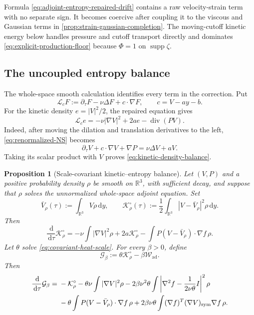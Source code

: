 \documentclass[11pt]{amsart}
\numberwithin{equation}{section}
\theoremstyle{plain}
\newtheorem{proposition}[proposition]{Proposition}
\theoremstyle{definition}
\theoremstyle{remark}
\newcommand{\R}{\mathbb R}
\newcommand{\dd}{\,\mathrm d}
\newcommand{\diver}{\operatorname{div}}
\newcommand{\supp}{\operatorname{supp}}
\begin{document}
Formula \eqref{eq:adjoint-entropy-repaired-drift} contains a raw
velocity-strain term with no separate sign.  It becomes
coercive after coupling it to the viscous and Gaussian terms in
\cref{prop:strain-gaussian-completion}.  The moving-cutoff kinetic energy below
handles pressure and cutoff transport directly and dominates
\eqref{eq:explicit-production-floor} because \(\Phi=1\) on
\(\supp\zeta\).

\subsection{The uncoupled entropy balance}

The whole-space smooth calculation identifies every term in the correction.
Put
\begin{equation}\label{eq:repaired-material-operator}
 \mathcal L_cF:=\partial_\tau F-\nu\Delta F+c\cdot\nabla F,
 \qquad c=V-ay-b.
\end{equation}
For the kinetic density \(e=|V|^2/2\), the repaired equation gives
\begin{equation}\label{eq:kinetic-density-balance}
 \mathcal L_ce
 =-\nu|\nabla V|^2+2ae-\diver(PV).
\end{equation}
Indeed, after moving the dilation and translation derivatives to the left,
\eqref{eq:renormalized-NS} becomes
\[
 \partial_\tau V+c\cdot\nabla V+\nabla P
 =\nu\Delta V+aV.
\]
Taking its scalar product with \(V\) proves
\eqref{eq:kinetic-density-balance}.

\begin{proposition}[Scale-covariant kinetic--entropy balance]
\label{prop:uncoupled-entropy-balance}
Let \((V,P)\) and a positive probability density \(\rho\) be smooth on
\(\R^3\), with sufficient decay, and suppose that \(\rho\) solves the
unnormalized whole-space adjoint equation.  Set
\[
 \bar V_\rho(\tau):=\int_{\R^3}V\rho\dd y,
 \qquad
 \mathcal K_\rho^\circ(\tau)
 :=\frac12\int_{\R^3}|V-\bar V_\rho|^2\rho\dd y.
\]
Then
\begin{equation}\label{eq:weighted-kinetic-balance}
 \frac{\dd}{\dd\tau}\mathcal K_\rho^\circ
 =-\nu\int|\nabla V|^2\rho
   +2a\mathcal K_\rho^\circ
   -\int P(V-\bar V_\rho)\cdot\nabla f\,\rho.
\end{equation}
Let \(\theta\) solve \eqref{eq:covariant-heat-scale}.  For every
\(\beta>0\), define
\begin{equation}\label{eq:scale-covariant-functional}
 \mathcal G_\beta
 :=\theta\mathcal K_\rho^\circ-\beta\mathcal W_{\mathrm{ad}}.
\end{equation}
Then
\begin{align}
 \frac{\dd}{\dd\tau}\mathcal G_\beta
 ={}&-\mathcal K_\rho^\circ
 -\theta\nu\int|\nabla V|^2\rho
 -2\beta\nu^2\theta\int
 \left|\nabla^2f-\frac{1}{2\nu\theta}I\right|^2\rho
 \notag\\
 &-\theta\int P(V-\bar V_\rho)\cdot\nabla f\,\rho
 +2\beta\nu\theta\int
 (\nabla f)^T(\nabla V)_{\mathrm{sym}}
 \nabla f\,\rho.
 \label{eq:uncoupled-entropy-balance}
\end{align}
\end{proposition}
\end{document}
